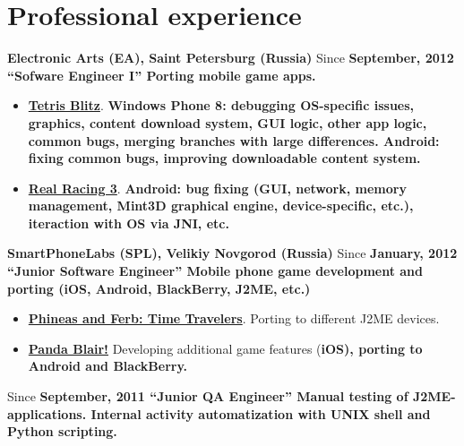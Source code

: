 \section{Professional experience}
{
\fontsize{12pt}{12pt}\selectfont
\bfseries Electronic Arts (EA)\mdseries, Saint Petersburg (Russia)
}
\subitem Since \bfseries September, 2012 ``Sofware Engineer I''\mdseries
\subitem Porting mobile game apps.
\begin{itemize}
\setlength{\itemindent}{20pt}
\item
    \href{http://www.windowsphone.com/en-us/store/app/tetris-blitz/806c88c7-528c-4563-9c0a-09ef31f14d61}
    {\bfseries Tetris Blitz\mdseries}. \bfseries Windows Phone 8\mdseries:
debugging OS-specific issues, graphics, content download system,
GUI logic, other app logic, common bugs,
merging branches with large differences.
    \bfseries Android\mdseries: fixing common bugs,
    improving downloadable content system.
\item
    \href{http://www.facebook.com/realracing}
    {\bfseries Real Racing 3\mdseries}.
    \bfseries Android\mdseries: bug fixing
    (GUI, network, memory management, Mint3D graphical engine,
    device-specific, etc.), iteraction with OS via JNI, etc.
\end{itemize}

{
\vspace{10pt}
\fontsize{12pt}{12pt}\selectfont
\bfseries SmartPhoneLabs (SPL)\mdseries, Velikiy Novgorod (Russia)
}
\subitem Since \bfseries January, 2012 ``Junior Software Engineer''\mdseries
\subitem Mobile phone game development and porting
(iOS, Android, BlackBerry, J2ME, etc.)
\begin{itemize}
\setlength{\itemindent}{20pt}
\item
    \href{http://java.mob.org/game/phineas\_and\_ferb\_time\_travelers.html}
        {\bfseries Phineas and Ferb: Time Travelers\mdseries}.
        Porting to different J2ME devices.
\item
    \href{https://itunes.apple.com/us/app/panda-blair!/id500995558?mt=8}
        {\bfseries Panda Blair!\mdseries}
        Developing additional game features (\bfseries iOS\mdseries),
        porting to \bfseries Android \mdseries and \bfseries BlackBerry\mdseries.
\end{itemize}

\vspace{10pt}
\subitem Since \bfseries September, 2011 ``Junior QA Engineer''\mdseries
\subitem Manual testing of J2ME-applications.
Internal activity automatization with UNIX shell and Python scripting.

